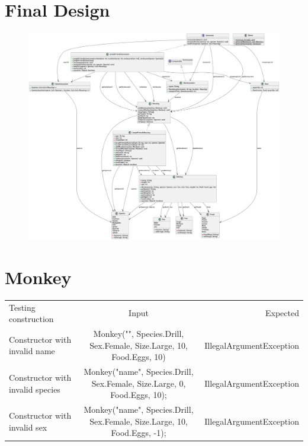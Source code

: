 \documentclass[12pt]{amsart}
\begin{document}
\section{Final Design}
\begin{figure}[htbp] %
\centering %
\includegraphics[width=1\textwidth]{sanctuary.png} %
\end{figure}

\newpage
\section{Monkey}

\begin{table}[htbp]
   \begin{tabular}{@{} lcr @{}} %

      Testing construction      & Input & Expected \\
         Constructor with invalid name       & Monkey("", Species.Drill, Sex.Female, Size.Large,
      10, Food.Eggs, 10)    &  IllegalArgumentException \\
         Constructor with invalid species       & Monkey("name", Species.Drill, Sex.Female, Size.Large,
      0, Food.Eggs, 10);     &  IllegalArgumentException \\
         Constructor with invalid sex       & Monkey("name", Species.Drill, Sex.Female, Size.Large,
      10, Food.Eggs, -1);     &  IllegalArgumentException \\
    \end{tabular}
\end{table}
\end{document}
